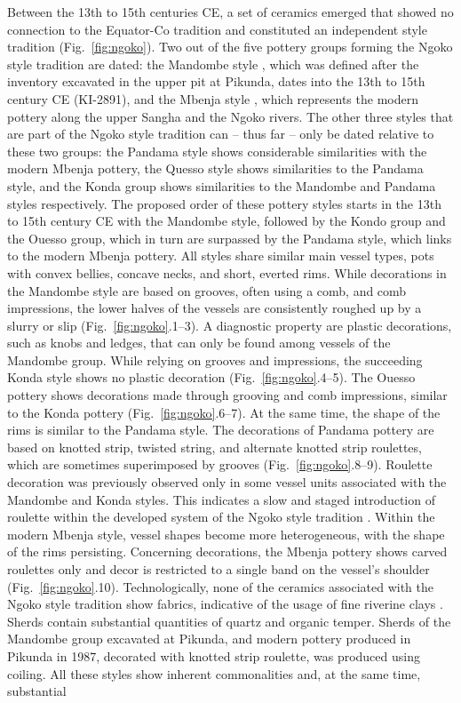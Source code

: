 \documentclass[smallextended,natbib]{svjour3}       %
\begin{document}
Between the 13th to 15th centuries CE, a set of ceramics emerged that showed no connection to the Equator-Co tradition and constituted an independent style tradition (Fig.~\ref{fig:ngoko}). Two out of the five pottery groups forming the Ngoko style tradition are dated: the Mandombe style \citep[145--148]{Seidensticker.2021e}, which was defined after the inventory excavated in the upper pit at Pikunda, dates into the 13th to 15th century CE (KI-2891), and the Mbenja style \citep[158--162]{Seidensticker.2021e}, which represents the modern pottery along the upper Sangha and the Ngoko rivers. The other three styles that are part of the Ngoko style tradition can -- thus far -- only be dated relative to these two groups: the Pandama style \citep[155--158]{Seidensticker.2021e} shows considerable similarities with the modern Mbenja pottery, the Quesso style \citep[152--155]{Seidensticker.2021e} shows similarities to the Pandama style, and the Konda group \citep[148--152]{Seidensticker.2021e} shows similarities to the Mandombe and Pandama styles respectively. The proposed order of these pottery styles starts in the 13th to 15th century CE with the Mandombe style, followed by the Kondo group and the Ouesso group, which in turn are surpassed by the Pandama style, which links to the modern Mbenja pottery. All styles share similar main vessel types, pots with convex bellies, concave necks, and short, everted rims. While decorations in the Mandombe style are based on grooves, often using a comb, and comb impressions, the lower halves of the vessels are consistently roughed up by a slurry or slip (Fig.~\ref{fig:ngoko}.1--3). A diagnostic property are plastic decorations, such as knobs and ledges, that can only be found among vessels of the Mandombe group. While relying on grooves and impressions, the succeeding Konda style shows no plastic decoration (Fig.~\ref{fig:ngoko}.4--5). The Ouesso pottery shows decorations made through grooving and comb impressions, similar to the Konda pottery (Fig.~\ref{fig:ngoko}.6--7). At the same time, the shape of the rims is similar to the Pandama style. The decorations of Pandama pottery are based on knotted strip, twisted string, and alternate knotted strip roulettes, which are sometimes superimposed by grooves (Fig.~\ref{fig:ngoko}.8--9). Roulette decoration was previously observed only in some vessel units associated with the Mandombe and Konda styles. This indicates a slow and staged introduction of roulette within the developed system of the Ngoko style tradition \citep[120--123]{Seidensticker.2016b}. Within the modern Mbenja style, vessel shapes become more heterogeneous, with the shape of the rims persisting. Concerning decorations, the Mbenja pottery shows carved roulettes only and decor is restricted to a single band on the vessel’s shoulder (Fig.~\ref{fig:ngoko}.10). Technologically, none of the ceramics associated with the Ngoko style tradition show fabrics, indicative of the usage of fine riverine clays \citep{Seidensticker.2020}. Sherds contain substantial quantities of quartz and organic temper. Sherds of the Mandombe group excavated at Pikunda, and modern pottery produced in Pikunda in 1987, decorated with knotted strip roulette, was produced using coiling. All these styles show inherent commonalities and, at the same time, substantial 
\end{document}
